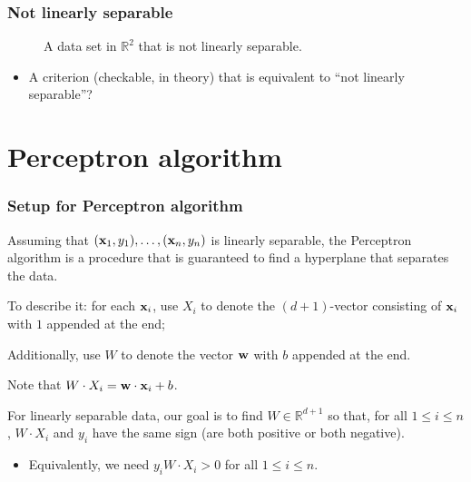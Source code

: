 \documentclass{beamer}
\theoremstyle{example}
\begin{document}
\begin{frame}
    \frametitle{Not linearly separable}
    \begin{figure}[h!]
        \centering
        \caption{A data set in $\mathbb R^2$ that is not linearly separable.}
        \label{figure:notseparable}
    \end{figure}
    \begin{itemize}
        \item A criterion (checkable, in theory) that is equivalent to ``not linearly separable''?
    \end{itemize}
\end{frame}

\section{Perceptron algorithm}

\begin{frame}
    \frametitle{Setup for Perceptron algorithm}
    Assuming that $({\bf x}_1, y_1), \ldots, ({\bf x}_n, y_n)$ is linearly separable, the Perceptron algorithm is a procedure that is guaranteed to find a hyperplane that separates the data.
    
    \pause
    To describe it: for each ${\bf x}_i$, use $X_i$ to denote the $(d+1)$-vector consisting of ${\bf x}_i$ with $1$ appended at the end;

    Additionally, use $W$ to denote the vector ${\bf w}$ with $b$ appended at the end.

    \pause
    Note that $W\cdot X_i = {\bf w}\cdot{\bf x}_i + b$. 

    For linearly separable data, our goal is to find $W\in\mathbb R^{d+1}$ so that, for all $1\le i\le n$, $W\cdot X_i$ and $y_i$ have the same sign (are both positive or both negative).
    \begin{itemize}
        \item Equivalently, we need $y_i W\cdot X_i > 0$ for all $1\le i\le n$.
    \end{itemize}
\end{frame}
\end{document}
